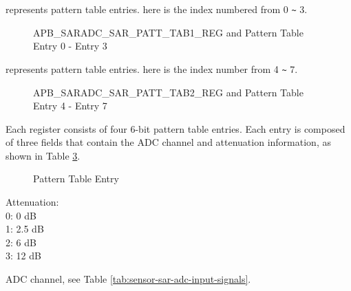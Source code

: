 \documentclass[main\_\_EN.tex]{subfiles}
\begin{document}
%
%
%
%
%
\begin{regdesc}\begin{reglist}
\item [cmd \regindex{x}] represents pattern table entries.  here is the index numbered from 0 \verb+~+ 3.
\end{reglist}\end{regdesc}
\vspace{-2em}
\begin{figure}[H]
    \centering
    \caption{APB\_SARADC\_SAR\_PATT\_TAB1\_REG and Pattern Table Entry 0 - Entry 3}
    \label{fig:sensor-apb-saradc-sar-patt-tab1-reg-pattern-tab-entry0-entry3}
\end{figure}

%
%
%
%
%
\begin{regdesc}\begin{reglist}
\item [cmd \regindex{x}] represents pattern table entries.  here is the index number from 4 \verb+~+ 7.
\end{reglist}\end{regdesc}
\vspace{-2em}
\begin{figure}[H]
    \centering
    \caption{APB\_SARADC\_SAR\_PATT\_TAB2\_REG and Pattern Table Entry 4 - Entry 7}
    \label{fig:sensor-apb-saradc-sar-patt-tab2-reg-pattern-tab-entry4-entry7}
\end{figure}

Each register consists of four 6-bit pattern table entries. Each entry is composed of three fields that contain the ADC channel and attenuation information, as shown in Table  \ref{fig:sensor-pattern-table-entry}.

\begin{figure}[H]
\centering
{}%
%
%
\end{figure}
\vspace{-2em}
\begin{figure}[H]
    \centering
    \caption{Pattern Table Entry}
    \label{fig:sensor-pattern-table-entry}
\end{figure}
\vspace{-2em}
\begin{regdesc}\begin{reglist}
\item [atten] Attenuation:\\
0: 0 dB\\
1: 2.5 dB\\
2: 6 dB\\
3: 12 dB
\item [ch\_sel] ADC channel, see Table \ref{tab:sensor-sar-adc-input-signals}.
\end{reglist}\end{regdesc}
\end{document}
